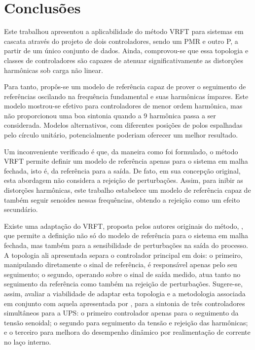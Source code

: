 \documentclass[repeatfields,oneside]{tcc}
\begin{document}

\chapter{Conclusões}\label{sec:conclusao}

Este trabalhou apresentou a aplicabilidade do método VRFT para sistemas em cascata através do projeto de dois controladores, sendo um PMR e outro P, a partir de um único conjunto de dados.
Ainda, comprovou-se que essa topologia e classes de controladores são capazes de atenuar significativamente as distorções harmônicas sob carga não linear.

Para tanto, propôs-se um modelo de referência capaz de prover o seguimento de referências oscilando na frequência fundamental e suas harmônicas ímpares.
Este modelo mostrou-se efetivo para controladores de menor ordem harmônica, mas não proporcionou uma boa sintonia quando a 9{\textordfeminine} harmônica passa a ser considerada.
Modelos alternativos, com diferentes posições de polos espalhadas pelo círculo unitário, potencialmente poderiam oferecer um melhor resultado.

Um inconveniente verificado é que, da maneira como foi formulado, o método VRFT permite definir um modelo de referência apenas para o sistema em malha fechada, isto é, da referência para a saída.
De fato, em sua concepção original, esta abordagem não considera a rejeição de perturbações.
Assim, para inibir as distorções harmônicas, este trabalho estabelece um modelo de referência capaz de também seguir senoides nessas frequências, obtendo a rejeição como um efeito secundário.

Existe uma adaptação do VRFT, proposta pelos autores originais do método, \textcite{Lecchini2001}, que permite a definição não só do modelo de referência para o sistema em malha fechada, mas também para a sensibilidade de perturbações na saída do processo.
A topologia ali apresentada separa o controlador principal em dois:
o primeiro, manipulando diretamente o sinal de referência, é responsável apenas pelo seu seguimento;
o segundo, operando sobre o sinal de saída medido, atua tanto no seguimento da referência como também na rejeição de perturbações.
Sugere-se, assim, avaliar a viabilidade de adaptar esta topologia e a metodologia associada em conjunto com aquela apresentada por \textcite{Chrystian2020}, para a sintonia de três controladores simultâneos para a UPS:
o primeiro controlador apenas para o seguimento da tensão senoidal;
o segundo para seguimento da tensão e rejeição das harmônicas; e
o terceiro para melhora do desempenho dinâmico por realimentação de corrente no laço interno.
\end{document}
